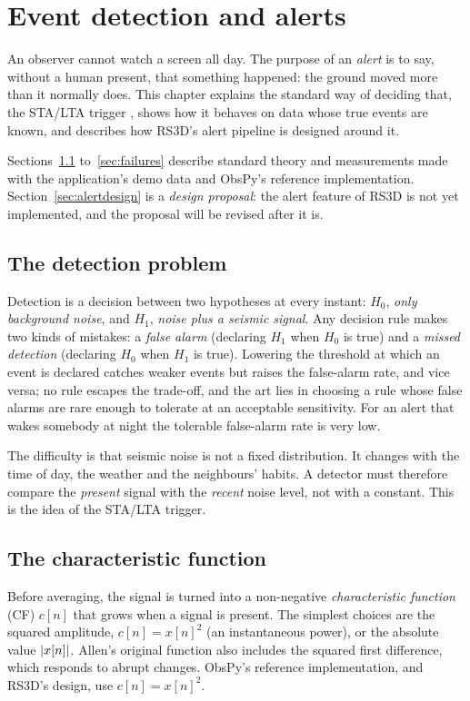 \chapter{Event detection and alerts}\label{ch:detect}

An observer cannot watch a screen all day. The purpose of an \emph{alert} is to say, without a human present, that
something happened: the ground moved more than it normally does. This chapter explains the standard way of
deciding that, the STA/LTA trigger \parencite{allen1978}, shows how it behaves on data whose true events are known,
and describes how RS3D's alert pipeline is designed around it.

\begin{rs3dwarn}
Sections~\ref{sec:detprob} to~\ref{sec:failures} describe standard theory and measurements made with the
application's demo data and ObsPy's reference implementation. Section~\ref{sec:alertdesign} is a \emph{design proposal}: the alert feature
of RS3D is not yet implemented, and the proposal will be revised after it is.
\end{rs3dwarn}

\section{The detection problem}\label{sec:detprob}
Detection is a decision between two hypotheses at every instant: $H_0$, \emph{only background noise}, and $H_1$, \emph{noise
plus a seismic signal}. Any decision rule makes two kinds of mistakes: a \emph{false alarm} (declaring $H_1$ when $H_0$ is
true) and a \emph{missed detection} (declaring $H_0$ when $H_1$ is true). Lowering the threshold at which an event is
declared catches weaker events but raises the false-alarm rate, and vice versa; no rule escapes the trade-off, and the art
lies in choosing a rule whose false alarms are rare enough to tolerate at an acceptable sensitivity. For an alert that wakes
somebody at night the tolerable false-alarm rate is very low.

The difficulty is that seismic noise is not a fixed distribution. It changes with the time of day, the weather and the
neighbours' habits. A detector must therefore compare the \emph{present} signal with the \emph{recent} noise level,
not with a constant. This is the idea of the STA/LTA trigger.

\section{The characteristic function}\label{sec:cf}
Before averaging, the signal is turned into a non-negative \emph{characteristic function} (CF) $c[n]$ that grows when a signal is
present. The simplest choices are the squared amplitude, $c[n]=x[n]^{2}$ (an instantaneous power), or the absolute value
$\left|x[n]\right|$. Allen's original function also includes the squared first difference, which responds to
abrupt changes. ObsPy's reference implementation, and RS3D's design, use $c[n]=x[n]^{2}$.

